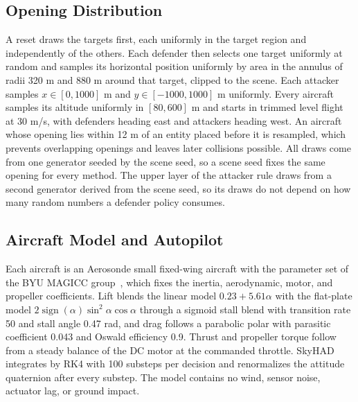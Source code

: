 \subsection{Opening Distribution}
A reset draws the targets first, each uniformly in the target region and independently of the others. Each defender then selects one target uniformly at random and samples its horizontal position uniformly by area in the annulus of radii 320 m and 880 m around that target, clipped to the scene. Each attacker samples $x\in[0,1000]$ m and $y\in[-1000,1000]$ m uniformly. Every aircraft samples its altitude uniformly in $[80,600]$ m and starts in trimmed level flight at 30 m/s, with defenders heading east and attackers heading west. An aircraft whose opening lies within 12 m of an entity placed before it is resampled, which prevents overlapping openings and leaves later collisions possible. All draws come from one generator seeded by the scene seed, so a scene seed fixes the same opening for every method. The upper layer of the attacker rule draws from a second generator derived from the scene seed, so its draws do not depend on how many random numbers a defender policy consumes.

\subsection{Aircraft Model and Autopilot}
Each aircraft is an Aerosonde small fixed-wing aircraft with the parameter set of the BYU MAGICC group~\cite{beard2012small}, which fixes the inertia, aerodynamic, motor, and propeller coefficients. Lift blends the linear model $0.23+5.61\alpha$ with the flat-plate model $2\operatorname{sign}(\alpha)\sin^2\alpha\cos\alpha$ through a sigmoid stall blend with transition rate 50 and stall angle 0.47 rad, and drag follows a parabolic polar with parasitic coefficient 0.043 and Oswald efficiency 0.9. Thrust and propeller torque follow from a steady balance of the DC motor at the commanded throttle. SkyHAD integrates  by RK4 with 100 substeps per decision and renormalizes the attitude quaternion after every substep. The model contains no wind, sensor noise, actuator lag, or ground impact.


